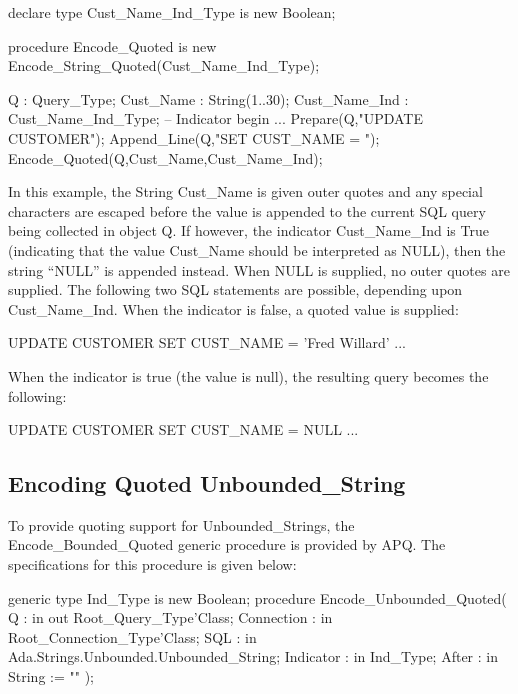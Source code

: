 \documentclass[english,letterpaper]{book}
\begin{document}
\begin{Example}
declare
   type Cust_Name_Ind_Type is new Boolean;

   procedure Encode_Quoted 
      is new Encode_String_Quoted(Cust_Name_Ind_Type);

   Q :             Query_Type;
   Cust_Name :     String(1..30);
   Cust_Name_Ind : Cust_Name_Ind_Type; -- Indicator
begin
   ...
   Prepare(Q,"UPDATE CUSTOMER");
   Append_Line(Q,"SET CUST_NAME = ");
   Encode_Quoted(Q,Cust_Name,Cust_Name_Ind);
\end{Example}

In this example, the String Cust\_Name is given outer quotes
and any special characters are escaped before the value is appended
to the current SQL query being collected in object Q. If however,
the indicator Cust\_Name\_Ind is True (indicating that the
value Cust\_Name should be interpreted as NULL), then the string
``NULL'' is appended instead. When NULL is supplied, no outer
quotes are supplied. The following two SQL statements are possible,
depending upon Cust\_Name\_Ind. When the indicator is false,
a quoted value is supplied:

\begin{SQL}
UPDATE CUSTOMER
SET CUST_NAME = 'Fred Willard'
...
\end{SQL}

When the indicator is true (the value is null), the resulting query
becomes the following:

\begin{SQL}
UPDATE CUSTOMER
SET CUST_NAME = NULL
...
\end{SQL}

\subsection{Encoding Quoted Unbounded\_String}

To provide quoting support for Unbounded\-\_Strings,
the Encode\-\_Bounded\-\_Quoted gen\-eric procedure is provided by APQ.
The specifications for this procedure is given below:

\begin{Code}
generic
   type Ind_Type is new Boolean;
procedure Encode_Unbounded_Quoted(
   Q :          in out Root_Query_Type'Class;
   Connection : in     Root_Connection_Type'Class;
   SQL :        in     Ada.Strings.Unbounded.Unbounded_String;
   Indicator :  in     Ind_Type;
   After :      in     String := ""
);
\end{Code}
\end{document}
